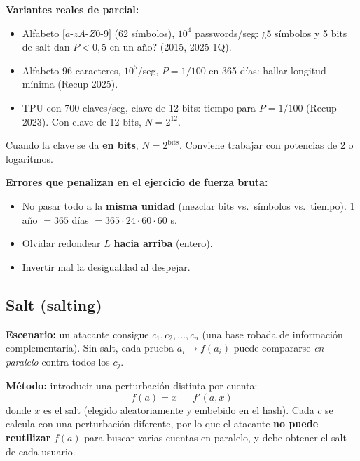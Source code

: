 \documentclass[../main.tex]{subfiles}
\begin{document}
\begin{examen}
\textbf{Variantes reales de parcial:}
\begin{itemize}[itemsep=1pt]
  \item Alfabeto $[a$-$zA$-$Z0$-$9]$ (62 símbolos), $10^4$ passwords/seg: ¿5 símbolos y 5 bits de salt dan $P<0{,}5$ en un año? (2015, 2025-1Q).
  \item Alfabeto 96 caracteres, $10^5$/seg, $P=1/100$ en 365 días: hallar longitud mínima (Recup 2025).
  \item TPU con 700 claves/seg, clave de 12 bits: tiempo para $P=1/100$ (Recup 2023). Con clave de 12 bits, $N=2^{12}$.
\end{itemize}
Cuando la clave se da \textbf{en bits}, $N=2^{\text{bits}}$. Conviene trabajar con potencias de 2 o logaritmos.
\end{examen}

\begin{ojo}
\textbf{Errores que penalizan en el ejercicio de fuerza bruta:}
\begin{itemize}[itemsep=1pt]
  \item No pasar todo a la \textbf{misma unidad} (mezclar bits vs.\ símbolos vs.\ tiempo). 1 año $=365$ días $=365\cdot24\cdot60\cdot60$ s.
  \item Olvidar redondear $L$ \textbf{hacia arriba} (entero).
  \item Invertir mal la desigualdad al despejar.
\end{itemize}
\end{ojo}

\subsection{Salt (salting)}

\textbf{Escenario:} un atacante consigue $c_1,c_2,\dots,c_n$ (una base robada de información complementaria). Sin salt, cada prueba $a_i \to f(a_i)$ puede compararse \emph{en paralelo} contra todos los $c_j$.

\textbf{Método:} introducir una perturbación distinta por cuenta:
$$f(a) = x \;\|\; f'(a,x)$$
donde $x$ es el salt (elegido aleatoriamente y embebido en el hash). Cada $c$ se calcula con una perturbación diferente, por lo que el atacante \textbf{no puede reutilizar} $f(a)$ para buscar varias cuentas en paralelo, y debe obtener el salt de cada usuario.
\end{document}
